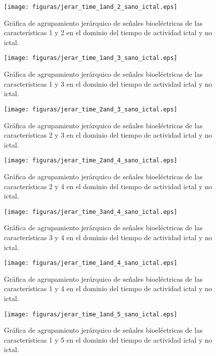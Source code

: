 \begin{figure}[H]
    \centering
    \texttt{[image: figuras/jerar\_time\_1and\_2\_sano\_ictal.eps]}
    \caption{Gráfica de agrupamiento jerárquico de señales bioeléctricas de las características 1 y 2 en el dominio del tiempo  de actividad ictal y no ictal.}
    \label{fig: jerar_Time_1_2}
\end{figure}
\begin{figure}[H]
    \centering
    \texttt{[image: figuras/jerar\_time\_1and\_3\_sano\_ictal.eps]}
    \caption{Gráfica de agrupamiento jerárquico de señales bioeléctricas de las características 1 y 3 en el dominio del tiempo  de actividad ictal y no ictal.}
    \label{fig: jerar_Time_1_3}
\end{figure}
\begin{figure}[H]
    \centering
    \texttt{[image: figuras/jerar\_time\_2and\_3\_sano\_ictal.eps]}
    \caption{Gráfica de agrupamiento jerárquico de señales bioeléctricas de las características 2 y 3 en el dominio del tiempo  de actividad ictal y no ictal.}
    \label{fig: jerar_Time_2_3}
\end{figure}
\begin{figure}[H]
    \centering
    \texttt{[image: figuras/jerar\_time\_2and\_4\_sano\_ictal.eps]}
    \caption{Gráfica de agrupamiento jerárquico de señales bioeléctricas de las características 2 y 4 en el dominio del tiempo  de actividad ictal y no ictal.}
    \label{fig: jerar_Time_2_4}
\end{figure}
\begin{figure}[H]
    \centering
    \texttt{[image: figuras/jerar\_time\_3and\_4\_sano\_ictal.eps]}
    \caption{Gráfica de agrupamiento jerárquico de señales bioeléctricas de las características 3 y 4 en el dominio del tiempo  de actividad ictal y no ictal.}
    \label{fig: jerar_Time_3_4}
\end{figure}


\begin{figure}[H]
    \centering
    \texttt{[image: figuras/jerar\_time\_1and\_4\_sano\_ictal.eps]}
    \caption{Gráfica de agrupamiento jerárquico de señales bioeléctricas de las características 1 y 4 en el dominio del tiempo  de actividad ictal y no ictal.}
    \label{fig: jerar_Time_1_4}
\end{figure}
\begin{figure}[H]
    \centering
    \texttt{[image: figuras/jerar\_time\_1and\_5\_sano\_ictal.eps]}
    \caption{Gráfica de agrupamiento jerárquico de señales bioeléctricas de las características 1 y 5 en el dominio del tiempo  de actividad ictal y no ictal.}
    \label{fig: jerar_Time_1_5}
\end{figure}



